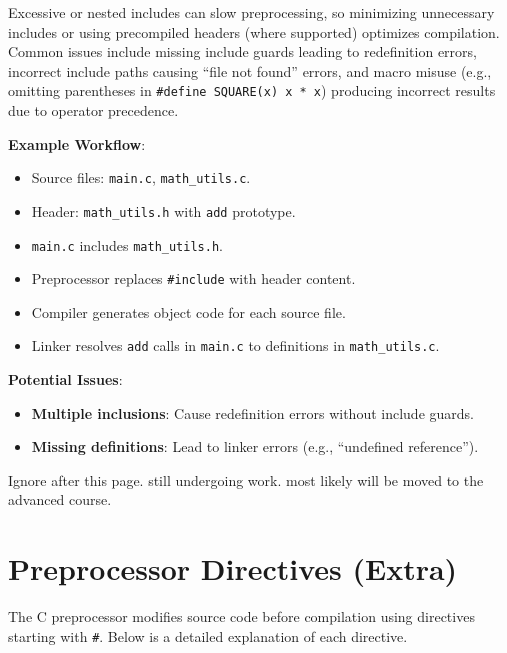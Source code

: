 \documentclass[a4paper,12pt]{article}
\begin{document}
Excessive or nested includes can slow preprocessing, so minimizing unnecessary includes or using precompiled headers (where supported) optimizes compilation. Common issues include missing include guards leading to redefinition errors, incorrect include paths causing ``file not found'' errors, and macro misuse (e.g., omitting parentheses in \texttt{\#define SQUARE(x) x * x}) producing incorrect results due to operator precedence.

\textbf{Example Workflow}:
\begin{itemize}[noitemsep]
    \item Source files: \texttt{main.c}, \texttt{math\_utils.c}.
    \item Header: \texttt{math\_utils.h} with \texttt{add} prototype.
    \item \texttt{main.c} includes \texttt{math\_utils.h}.
    \item Preprocessor replaces \texttt{\#include} with header content.
    \item Compiler generates object code for each source file.
    \item Linker resolves \texttt{add} calls in \texttt{main.c} to definitions in \texttt{math\_utils.c}.
\end{itemize}

\textbf{Potential Issues}:
\begin{itemize}[noitemsep]
    \item \textbf{Multiple inclusions}: Cause redefinition errors without include guards.
    \item \textbf{Missing definitions}: Lead to linker errors (e.g., ``undefined reference'').
\end{itemize}

\begin{center}
    \Huge{Ignore after this page. still undergoing work. most likely will be moved to the advanced course.}
\end{center}

\newpage

\section{Preprocessor Directives (Extra)}

The C preprocessor modifies source code before compilation using directives starting with \texttt{\#}. Below is a detailed explanation of each directive.
\end{document}
